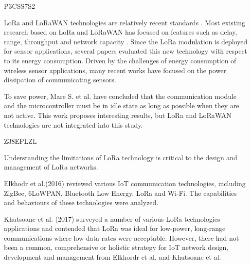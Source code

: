 \cite{bouguera_energy_2018} P3CSS7S2

LoRa and LoRaWAN technologies are relatively recent standards \cite{augustin_study_2016}.
Most existing research based on LoRa and LoRaWAN has focused on features such as delay,
	range,
	throughput and network capacity \cite{bor_lora_2017} \cite{augustin_study_2016}\cite{jetmir_haxhibeqiri_lora_2017}\cite{nolan_evaluation_2016}.
Since the LoRa modulation is deployed for sensor applications,
	several papers evaluated this new technology with respect to its energy consumption.
Driven by the challenges of energy consumption of wireless sensor applications,
	many recent works have focused on the power dissipation of communicating sensors.


To save power,
	Mare S.
et al.
have concluded that the communication module and the microcontroller must be in idle state as long as possible when they are not active.
This work proposes interesting results,
	but LoRa and LoRaWAN technologies are not integrated into this study.


	



\cite{chen_viable_2018}Z38EPLZL

Understanding the limitations of LoRa technology is critical to the design and management of LoRa networks.

Elkhodr et al.(2016) reviewed various IoT communication technologies,
	including ZigBee, 6LoWPAN,
	Bluetooth Low Energy,
	LoRa and Wi-Fi.
The capabilities and behaviours of these technologies were analyzed.

Khutsoane et al.
(2017) surveyed a number of various LoRa technologies applications and contended that LoRa was ideal for low-power,
	long-range communications where low data rates were acceptable.
However,
	there had not been a common,
	comprehensive or holistic strategy for IoT network design,
	development and management from Elkhordr et al.
and Khutsoane et al.


